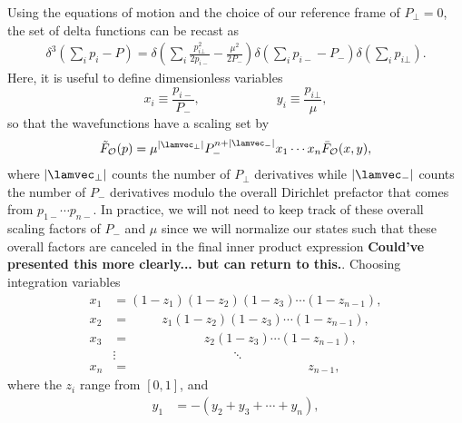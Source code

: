 Using the equations of motion and the choice of our reference frame of $P_\bot = 0$, the set of delta functions can be recast as \begin{equation}
	\begin{aligned}
		\delta^3\left(\sum_i p_i - P \right) = \delta\left(\sum_i \frac{p_{i\bot}^2}{2p_{i-}} - \frac{\mu^2}{2P_-} \right)\delta\left(\sum_i p_{i-} - P_- \right)\delta\left(\sum_i p_{i\bot}\right).
	\end{aligned}
\end{equation} Here, it is useful to define dimensionless variables \begin{equation}
	x_i \equiv \frac{p_{i-}}{P_-},\quad\quad\quad\quad\quad\quad y_i \equiv \frac{p_{i\bot}}{\mu}, \label{dimlessvars}
\end{equation} so that the wavefunctions have a scaling set by \begin{equation}
	\tilde{F}_{\CO}(p) = \mu^{|\lamvec_\bot|} P_-^{n+|\lamvec_-|} x_1 \dotsb x_n \bar{F}_{\CO}(x,y),
\end{equation} where $|\lamvec_\bot|$ counts the number of $P_\bot$ derivatives while $|\lamvec_-|$ counts the number of $P_-$ derivatives modulo the overall Dirichlet prefactor that comes from $p_{1-} \dotsb p_{n-}$. In practice, we will not need to keep track of these overall scaling factors of $P_-$ and $\mu$ since we will normalize our states such that these overall factors are canceled in the final inner product expression {{\color{red} \textbf{Could've presented this more clearly... but can return to this.}}. Choosing integration variables \begin{equation}
		\begin{aligned}
			x_1 &= (1-z_1)(1-z_2)(1-z_3) \dotsb (1-z_{n-1}), \\
			x_2 &= \quad\quad\,\,\, z_1(1-z_2)(1-z_3) \dotsb (1-z_{n-1}), \\
			x_3 &= \quad\quad\,\,\, \quad\quad\quad\,\, z_2(1-z_3) \dotsb (1-z_{n-1}), \\
			&\vdots \quad\quad\quad\quad\quad\quad\quad\quad\quad \ddots \\
			x_n &= \quad\quad\quad\quad\quad\quad\quad\quad\quad\quad\quad\quad\quad\quad z_{n-1}, \label{xtrans}
		\end{aligned}
	\end{equation} where the $z_i$ range from $[0, 1]$, and \begin{equation}
		\begin{aligned}
			y_1 &= -(y_2+ y_3 + \dotsb + y_n), \\

\end{aligned}
\end{equation}}
